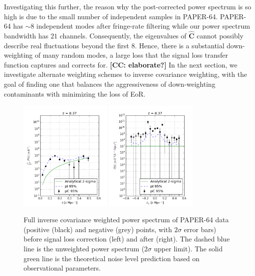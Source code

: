 \documentclass[preprint2,numberedappendix,tighten]{aastex6}  %
\newcommand{\cc}[1]{{\color{purple} \textbf{[CC: #1]}}}
\begin{document}
Investigating this further, the reason why the post-corrected power spectrum is so high is due to the small number of independent samples in PAPER-64. PAPER-64 has $\sim 8$ independent modes after fringe-rate filtering while our power spectrum bandwidth has $21$ channels. Consequently, the eigenvalues of $\hat{\textbf{C}}$ cannot possibly describe real fluctuations beyond the first $8$. Hence, there is a substantial down-weighting of many random modes, a large loss that the signal loss transfer function captures and corrects for. \cc{elaborate?} In the next section, we investigate alternate weighting schemes to inverse covariance weighting, with the goal of finding one that balances the aggressiveness of down-weighting contaminants with minimizing the loss of EoR. 

\begin{figure}
	\centering
	\includegraphics[width=0.4\textwidth]{plots/ps2_data_nosigloss.png}
	\includegraphics[width=0.4\textwidth]{plots/ps2_data.png}
	\caption{Full inverse covariance weighted power spectrum of PAPER-64 data (positive (black) and negative (grey) points, with $2\sigma$ error bars) before signal loss correction (left) and after (right). The dashed blue line is the unweighted power spectrum ($2\sigma$ upper limit). The solid green line is the theoretical noise level prediction based on observational parameters.}
	\label{fig:ps2_data}
\end{figure}
\end{document}
